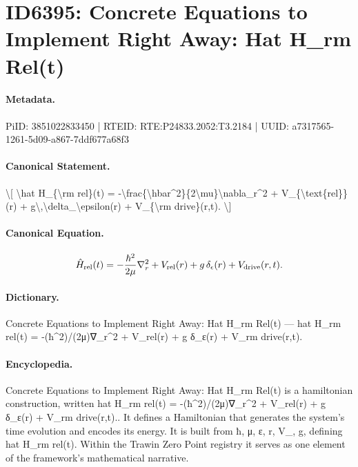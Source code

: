 \section*{ID6395: Concrete Equations to Implement Right Away: Hat H\_rm Rel(t)}
\paragraph{Metadata.}
PiID: 3851022833450 | RTEID: RTE:P24833.2052:T3.2184 | UUID: a7317565-1261-5d09-a867-7ddf677a68f3

\paragraph{Canonical Statement.}
\textbackslash{}[ \textbackslash{}hat H\_\{\textbackslash{}rm rel\}(t) = -\textbackslash{}frac\{\textbackslash{}hbar\textasciicircum{}2\}\{2\textbackslash{}mu\}\textbackslash{}nabla\_r\textasciicircum{}2 + V\_\{\textbackslash{}text\{rel\}\}(r) + g\textbackslash{},\textbackslash{}delta\_\textbackslash{}epsilon(r) + V\_\{\textbackslash{}rm drive\}(r,t). \textbackslash{}]

\paragraph{Canonical Equation.}
\[
\hat H_{\rm rel}(t) = -\frac{\hbar^2}{2\mu}\nabla_r^2 + V_{\text{rel}}(r) + g\,\delta_\epsilon(r) + V_{\rm drive}(r,t).
\]

\paragraph{Dictionary.}
Concrete Equations to Implement Right Away: Hat H\_rm Rel(t) — hat H\_rm rel(t) = -(ħ\textasciicircum{}2)/(2μ)∇\_r\textasciicircum{}2 + V\_rel(r) + g δ\_ε(r) + V\_rm drive(r,t).

\paragraph{Encyclopedia.}
Concrete Equations to Implement Right Away: Hat H\_rm Rel(t) is a hamiltonian construction, written hat H\_rm rel(t) = -(ħ\textasciicircum{}2)/(2μ)∇\_r\textasciicircum{}2 + V\_rel(r) + g δ\_ε(r) + V\_rm drive(r,t).. It defines a Hamiltonian that generates the system's time evolution and encodes its energy. It is built from ħ, μ, ε, r, V\_, g, defining hat H\_rm rel(t). Within the Trawin Zero Point registry it serves as one element of the framework's mathematical narrative.
